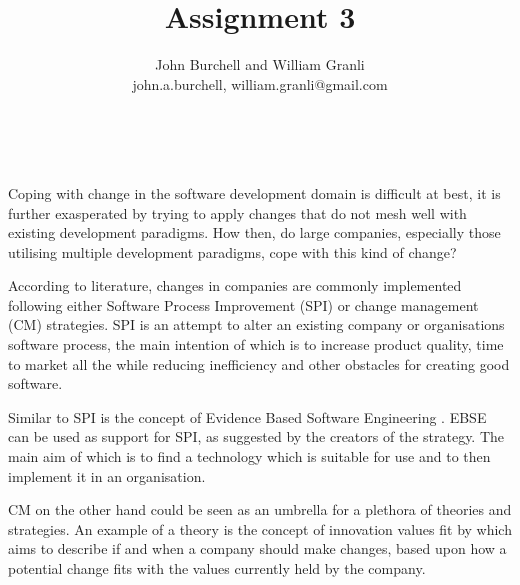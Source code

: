 \documentclass[times, 10pt,twocolumn]{Article}
\begin{document}
\title{Assignment 3}

\author{John Burchell and William Granli \\
john.a.burchell, william.granli@gmail.com}


\maketitle
\thispagestyle{empty}



​

Coping with change in the software development domain is difficult at best, it is further exasperated by trying to apply changes that do not mesh well with existing development paradigms. How then, do large companies, especially those utilising multiple development paradigms, cope with this kind of change?



According to literature, changes in companies are commonly implemented following either Software Process Improvement (SPI)\cite{pettersson2008practitioner}\cite{unterkalmsteiner2012evaluation} or change management (CM) strategies. SPI is an attempt to alter an existing company or organisations software process, the main intention of which is to increase product quality, time to market all the while reducing inefficiency and other obstacles for creating good software. 

Similar to SPI is the concept of Evidence Based Software Engineering \cite{dyba2005evidence}. EBSE can be used as support for SPI, as suggested by the creators of the strategy. The main aim of which is to find a technology which is suitable for use and to then implement it in an organisation.

CM on the other hand could be seen as an umbrella for a plethora of theories and strategies. An example of a theory is the concept of innovation values fit by \cite{klein1996challenge} which aims to describe if and when a company should make changes, based upon how a potential change fits with the values currently held by the company.
\end{document}
